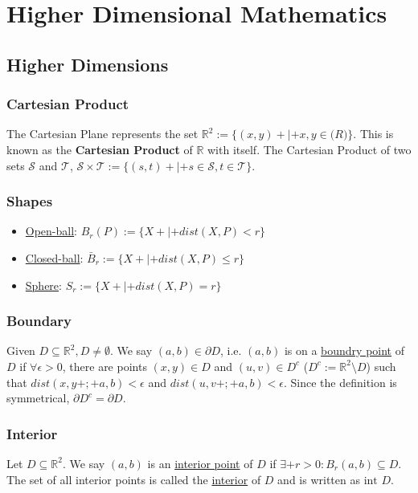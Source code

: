 \section{Higher Dimensional Mathematics}

\subsection{Higher Dimensions}
\subsubsection{Cartesian Product}
The Cartesian Plane represents the set $\mathbb{R}^2 := \{(x, y)+|+x, y\in \mathbb(R)\}$. This is known as the \textbf{Cartesian Product} of $\mathbb{R}$ with
itself. The Cartesian Product of two sets $\mathcal{S}$ and $\mathcal{T}$,
$\mathcal{S} \times \mathcal{T} :=  \{(s, t)+|+s\in\mathcal{S},
t\in\mathcal{T}\}$.

\subsubsection{Shapes}
\begin{itemize}
\item \underline{Open-ball}:
$B_r(P) := \{X+|+dist(X, P) < r\}$
\item \underline{Closed-ball}:
$\bar{B}_r := \{X+|+ dist(X, P) \leq r\}$
\item \underline{Sphere}:
$S_r := \{X+|+dist(X, P) = r\}$
\end{itemize}

\subsubsection{Boundary}
Given $D \subseteq \mathbb{R}^2, D \neq \emptyset$. We say $(a, b) \in
\partial D$, i.e. $(a, b)$ is on a \underline{boundry point} of $D$ if $\forall
\epsilon > 0$, there are points $(x, y)\in D$ and $(u, v) \in D^c$ ($D^c :=
\mathbb{R}^2 \setminus D$) such that $dist(x, y+;+ a, b) < \epsilon$ and
$dist(u, v+;+ a, b) < \epsilon$. Since the definition is symmetrical, $\partial D^c = \partial D$.

\subsubsection{Interior}
Let $D \subseteq \mathbb{R}^2$. We say $(a, b)$ is an
\underline{interior point} of $D$ if $\exists+ r > 0:B_r(a, b)\subseteq D$.
The set of all interior points is called the \underline{interior} of $D$ and is
written as $\text{int } D$.

